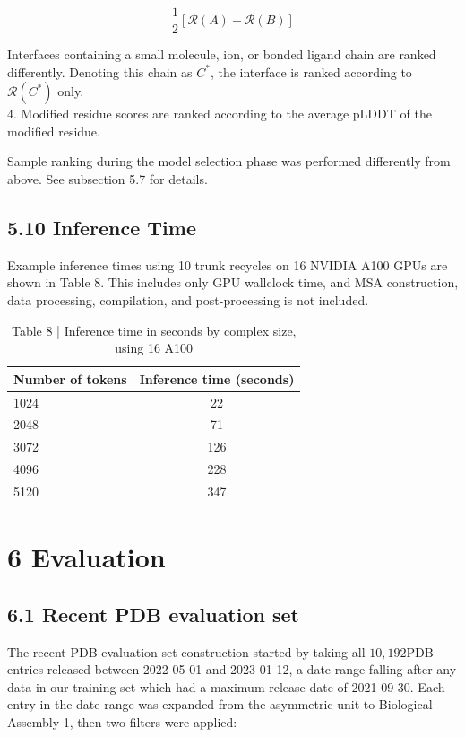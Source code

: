 \documentclass[10pt]{article}
\begin{document}
\begin{equation*}
\frac{1}{2}[\mathcal{R}(A)+\mathcal{R}(B)] \tag{20}
\end{equation*}


Interfaces containing a small molecule, ion, or bonded ligand chain are ranked differently. Denoting this chain as $C^{*}$, the interface is ranked according to $\mathcal{R}\left(C^{*}\right)$ only.\\
4. Modified residue scores are ranked according to the average pLDDT of the modified residue.

Sample ranking during the model selection phase was performed differently from above. See subsection 5.7 for details.

\subsection*{5.10 Inference Time}
Example inference times using 10 trunk recycles on 16 NVIDIA A100 GPUs are shown in Table 8. This includes only GPU wallclock time, and MSA construction, data processing, compilation, and post-processing is not included.

\begin{table}[h]
\begin{center}
\captionsetup{labelformat=empty}
\caption{Table 8 | Inference time in seconds by complex size, using 16 A100}
\begin{tabular}{lc}
\hline
Number of tokens & Inference time (seconds) \\
\hline
1024 & 22 \\
2048 & 71 \\
3072 & 126 \\
4096 & 228 \\
5120 & 347 \\
\hline
\end{tabular}
\end{center}
\end{table}

\section*{6 Evaluation}
\subsection*{6.1 Recent PDB evaluation set}
The recent PDB evaluation set construction started by taking all $10,192 \mathrm{PDB}$ entries released between 2022-05-01 and 2023-01-12, a date range falling after any data in our training set which had a maximum release date of 2021-09-30. Each entry in the date range was expanded from the asymmetric unit to Biological Assembly 1, then two filters were applied:
\end{document}
